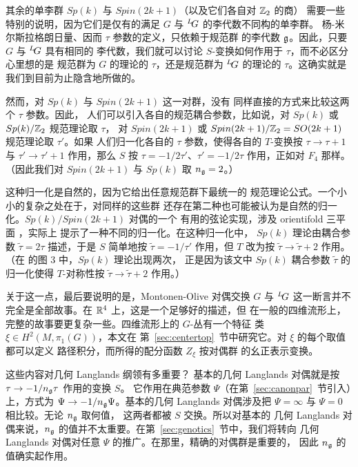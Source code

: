 其余的单李群 $Sp(k)$ 与 $Spin(2k+1)$（以及它们各自对 $\Bbb{Z}_2$ 的商）
需要一些特别的说明，因为它们是仅有的满足 $G$ 与 $^L\negthinspace G$ 的李代数不同构的单李群。
杨-米尔斯拉格朗日量、因而 $\tau$ 参数的定义，只依赖于规范群
的李代数 $\frak g$。因此，只要 $G$ 与 $^L\negthinspace G$ 具有相同的
李代数，我们就可以讨论 $S$-变换如何作用于 $\tau$，而不必区分心里想的是
规范群为 $G$ 的理论的 $\tau$，还是规范群为 $^L\negthinspace G$ 的理论的
$\tau$。这确实就是我们到目前为止隐含地所做的。

然而，对 $Sp(k)$ 与 $Spin(2k+1)$ 这一对群，没有
同样直接的方式来比较这两个 $\tau$ 参数。因此，
人们可以引入各自的规范耦合参数，比如说，对 $Sp(k)$ 或 $Sp(k)/\Bbb{Z}_2$ 规范理论取 $\tau$，
对 $Spin(2k+1)$ 或 $Spin(2k+1)/\Bbb{Z}_2=SO(2k+1)$ 规范理论取 $\tau'$。如果
人们归一化各自的 $\tau$ 参数，使得各自的 $T$-变换按 $\tau\to \tau+1$ 与
$\tau'\to\tau'+1$ 作用，那么 $S$ 按 $\tau=-1/2\tau'$、$\tau'=
-1/2\tau$ 作用，正如对 $F_4$ 那样。（因此我们对
$Spin(2k+1)$ 与 $Sp(k)$ 取 $n_{\frak g}=2$。）

这种归一化是自然的，因为它给出任意规范群下最统一的
规范理论公式。一个小小的复杂之处在于，对同样的这些群
还存在第二种也可能被认为是自然的归一化。$Sp(k)/Spin(2k+1)$ 对偶的一个
有用的弦论实现，涉及 orientifold 三平面 \cite{ref49}，实际上
提示了一种不同的归一化。在这种归一化中，
$Sp(k)$ 理论由耦合参数
$\tilde\tau=2\tau$ 描述，于是 $S$ 简单地按 $\tilde \tau =
-1/\tau'$ 作用，但 $T$ 改为按 $\tilde\tau\to \tilde \tau+2$ 作用。
（在 \cite{ref49} 的图 3 中，$Sp(k)$ 理论出现两次，
正是因为该文中 $Sp(k)$ 耦合参数 $\tilde\tau$ 的归一化使得 $T$-对称性按
$\tilde\tau\to\tilde\tau+2$ 作用。）

关于这一点，最后要说明的是，Montonen-Olive
对偶交换 $G$ 与 $^L\negthinspace G$ 这一断言并不完全是全部故事。在 $\Bbb{R}^4$ 上，这是一个足够好的描述，但
在一般的四维流形上，完整的故事要更复杂一些。四维流形上的 $G$-丛有一个特征
类 $\xi\in H^2(M,\pi_1(G))$，本文在
第~\ref{sec:centertop}~节中研究它。对 $\xi$ 的每个取值都可以定义
路径积分，而所得的配分函数 $Z_\xi$ 按对偶群
\cite{ref45,ref26} 的幺正表示变换。

这些内容对几何 Langlands 纲领有多重要？
基本的几何 Langlands 对偶就是按 $\tau\to -1/n_{\frak g}\tau$ 作用的变换 $S$。
它作用在典范参数 $\Psi$（在第~\ref{sec:canonpar}~节引入）上，方式为
$\Psi\to -1/n_{\frak g}\Psi$。基本的几何 Langlands
对偶涉及把 $\Psi=\infty$ 与 $\Psi=0$ 相比较。无论 $n_{\frak g}$ 取何值，
这两者都被 $S$ 交换。所以对基本的
几何 Langlands 对偶来说，$n_{\frak g}$ 的值并不太重要。在第~\ref{sec:genotics}~节中，我们将转向
几何 Langlands 对偶对任意 $\Psi$ 的推广。在那里，精确的对偶群是重要的，
因此 $n_{\frak g}$ 的值确实起作用。

